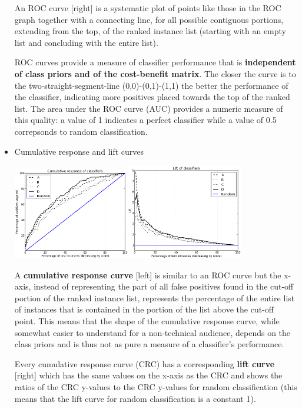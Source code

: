 \begin{itemize}
  \vspace{-0.5ex}
  {\small An ROC curve [right] is a systematic plot of points like those in the ROC graph together with a connecting line, for all possible contiguous portions, extending from the top, of the ranked instance list (starting with an empty list and concluding with the entire list).

  \vspace{-0.5ex}
    ROC curves provide a measure of classifier performance that is \textbf{independent of class priors and of the cost-benefit matrix}. The closer the curve is to the two-straight-segment-line (0,0)-(0,1)-(1,1) the better the performance of the classifier, indicating more positives placed towards the top of the ranked list. The area under the ROC curve (AUC) provides a numeric measure of this quality: a value of 1 indicates a perfect classifier while a value of 0.5 correpsonds to random classification.
    
    }
  \newpage

\item Cumulative response and lift curves
 
  \includegraphics[width=0.4\textwidth]{8-6_nocap.png}\hspace{0.15\textwidth}\includegraphics[width=0.4\textwidth]{8-7_nocap.png}

  {\small  A \textbf{cumulative response curve} [left] is similar to an ROC curve but the x-axis, instead of representing the part of all false positives found in the cut-off portion of the ranked instance list, represents the percentage of the entire list of instances that is contained in the portion of the list above the cut-off point. This means that the shape of the cumulative response curve, while somewhat easier to understand for a non-technical audience, depends on the class priors and is thus not as pure a measure of a classifier's performance. 

   Every cumulative response curve (CRC) has a corresponding \textbf{lift curve} [right] which has the same values on the x-axis as the CRC and shows the ratios of the CRC y-values to the CRC y-values for random classification (this means that the lift curve for random classification is a constant 1).
    
  }
  
\newpage
\end{itemize}

